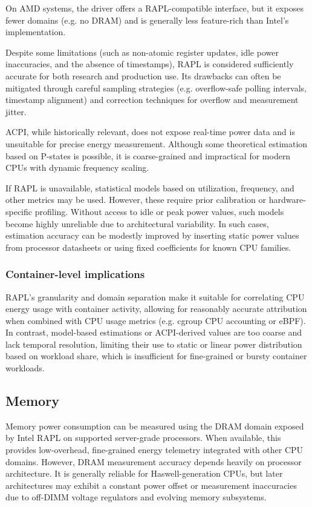 On AMD systems, the  driver offers a RAPL-compatible interface, but it exposes fewer domains (e.g. no DRAM) and is generally less feature-rich than Intel's implementation.

Despite some limitations (such as non-atomic register updates, idle power inaccuracies, and the absence of timestamps), RAPL is considered sufficiently accurate for both research and production use. Its drawbacks can often be mitigated through careful sampling strategies (e.g. overflow-safe polling intervals, timestamp alignment) and correction techniques for overflow and measurement jitter.

ACPI, while historically relevant, does not expose real-time power data and is unsuitable for precise energy measurement. Although some theoretical estimation based on P-states is possible, it is coarse-grained and impractical for modern CPUs with dynamic frequency scaling.

If RAPL is unavailable, statistical models based on utilization, frequency, and other metrics may be used. However, these require prior calibration or hardware-specific profiling. Without access to idle or peak power values, such models become highly unreliable due to architectural variability. In such cases, estimation accuracy can be modestly improved by inserting static power values from processor datasheets or using fixed coefficients for known CPU families.

\subsubsection{Container-level implications}
RAPL’s granularity and domain separation make it suitable for correlating CPU energy usage with container activity, allowing for reasonably accurate attribution when combined with CPU usage metrics (e.g. cgroup CPU accounting or eBPF). In contrast, model-based estimations or ACPI-derived values are too coarse and lack temporal resolution, limiting their use to static or linear power distribution based on workload share, which is insufficient for fine-grained or bursty container workloads.

\subsection{Memory}

Memory power consumption can be measured using the DRAM domain exposed by Intel RAPL on supported server-grade processors. When available, this provides low-overhead, fine-grained energy telemetry integrated with other CPU domains. However, DRAM measurement accuracy depends heavily on processor architecture. It is generally reliable for Haswell-generation CPUs, but later architectures may exhibit a constant power offset or measurement inaccuracies due to off-DIMM voltage regulators and evolving memory subsystems.

